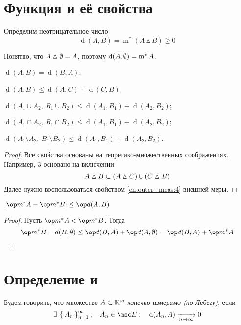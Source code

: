 \section{Функция  и её свойства}

Определим неотрицательное число
$$ \operatorname d(A, B) = \operatorname m^* (A \vartriangle B) \ge 0 $$

Понятно, что $ A \vartriangle \emptyset = A $, поэтому $ \operatorname d(A, \emptyset) = \operatorname m^* A $.

\begin{props}
	\item $ \operatorname d(A, B) = \operatorname d(B, A) $;
	\item $ \operatorname d(A, B) \le \operatorname d(A, C) + \operatorname d(C, B) $;
	\item $ \operatorname d(A_1 \cup A_2, ~ B_1 \cup B_2) \le \operatorname d(A_1, B_1) + \operatorname d(A_2, B_2) $;
	\item $ \operatorname d(A_1 \cap A_2, ~ B_1 \cap B_2) \le \operatorname d(A_1, B_1) + \operatorname d(A_2, B_2) $;
	\item $ \operatorname d(A_1 \setminus A_2, ~ B_1 \setminus B_2) \le \operatorname d(A_1, B_1) + \operatorname d(A_2, B_2) $.
\end{props}

\begin{proof}
	Все свойства основаны на теоретико-множественных соображениях. Например, 3 основано на включении
	$$ A \vartriangle B \subset (A \vartriangle C) \cup (C \vartriangle B) $$
	Далее нужно воспользоваться свойством \ref{en:outer_meas:4} внешней меры.
\end{proof}

\begin{statement}
	$ |\op m^* A - \op m^* B| \le \op d(A, B) $
\end{statement}

\begin{proof}
	Пусть $ \op m^* A < \op m^* B $. Тогда
	$$ \op m^* B = d(B, \O) \le \op d(B, A) + \op d(A, \O) = \op d(B, A) + \op m^* A $$
\end{proof}

\section{Определение  и }

\begin{definition}
	Будем говорить, что множество $ A \subset \mathbb{R}^m $ \emph{конечно-измеримо (по Лебегу)}, если
	$$ \exist \set{A_n}_{n = 1}^\infty, \quad A_n \in \msc E : \quad \operatorname d(A_n, A) \underarr{n \to \infty} 0 $$
\end{definition}

